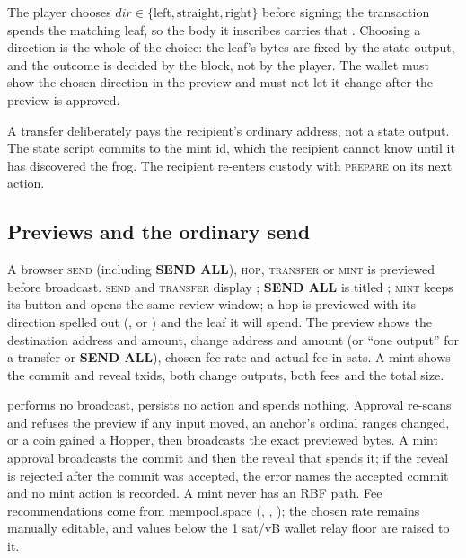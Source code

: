 The player chooses $\mathit{dir}\in\{\text{left},\text{straight},\text{right}\}$
before signing; the transaction spends the matching leaf, so the body it
inscribes carries that . Choosing a direction is the whole of the
choice: the leaf's bytes are fixed by the state output, and the outcome is
decided by the block, not by the player. The wallet must show the chosen
direction in the preview and must not let it change after the preview is
approved.

A transfer deliberately pays the recipient's ordinary address, not a state
output. The state script commits to the mint id, which the recipient cannot
know until it has discovered the frog. The recipient re-enters custody with
\textsc{prepare} on its next action.

\subsection{Previews and the ordinary send}

A browser \textsc{send} (including \textbf{SEND ALL}), \textsc{hop},
\textsc{transfer} or \textsc{mint} is previewed before broadcast.
\textsc{send} and \textsc{transfer} display ;
\textbf{SEND ALL} is titled ; \textsc{mint} keeps
its  button and opens the same review window; a hop is previewed
with its direction spelled out (,
 or ) and the leaf it will spend. The
preview shows the destination address and amount, change address and amount
(or ``one output'' for a transfer or \textbf{SEND ALL}), chosen fee rate and
actual fee in sats. A mint shows the commit and reveal txids, both change
outputs, both fees and the total size.

 performs no broadcast, persists no action and spends nothing.
Approval re-scans and refuses the preview if any input moved, an anchor's
ordinal ranges changed, or a coin gained a Hopper, then broadcasts the exact
previewed bytes. A mint approval broadcasts the commit and then the reveal
that spends it; if the reveal is rejected after the commit was accepted, the
error names the accepted commit and no mint action is recorded. A mint never
has an RBF path. Fee recommendations come from mempool.space
 (, ,
); the chosen rate remains manually editable, and values
below the 1 sat/vB wallet relay floor are raised to it.

